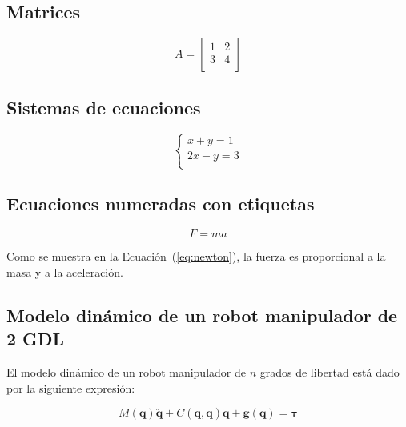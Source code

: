 \subsection{Matrices}

\begin{equation}
	A = 
	\begin{bmatrix}
		1 & 2 \\
		3 & 4 \\
	\end{bmatrix}
\end{equation}

\subsection{Sistemas de ecuaciones}

\begin{equation}
	\begin{cases}
		x + y = 1 \\
		2x - y = 3 \\
	\end{cases}
\end{equation}

\subsection{Ecuaciones numeradas con etiquetas}

\begin{equation}
	\label{eq:newton}
	F = ma
\end{equation}

Como se muestra en la Ecuación~(\ref{eq:newton}), la fuerza es proporcional a la masa y a la aceleración.

\subsection{Modelo dinámico de un robot manipulador de 2 GDL}

El modelo dinámico de un robot manipulador de $n$ grados de libertad está dado por la siguiente expresión:

\begin{equation}
	M(\mathbf{q})\ddot{\mathbf{q}} + C(\mathbf{q}, \dot{\mathbf{q}})\dot{\mathbf{q}} + \mathbf{g}(\mathbf{q}) = \mathbf{\tau}
\end{equation}

